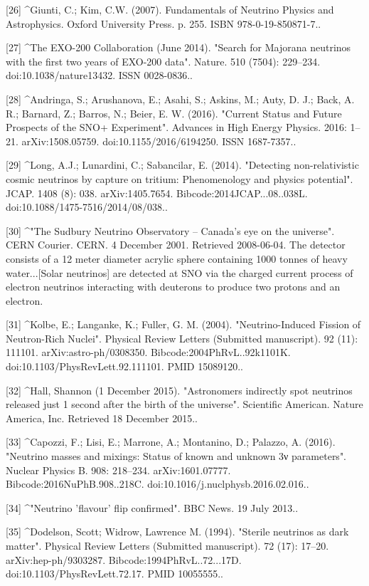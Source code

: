 [26]
^Giunti, C.; Kim, C.W. (2007). Fundamentals of Neutrino Physics and Astrophysics. Oxford University Press. p. 255. ISBN 978-0-19-850871-7..

[27]
^The EXO-200 Collaboration (June 2014). "Search for Majorana neutrinos with the first two years of EXO-200 data". Nature. 510 (7504): 229–234. doi:10.1038/nature13432. ISSN 0028-0836..

[28]
^Andringa, S.; Arushanova, E.; Asahi, S.; Askins, M.; Auty, D. J.; Back, A. R.; Barnard, Z.; Barros, N.; Beier, E. W. (2016). "Current Status and Future Prospects of the SNO+ Experiment". Advances in High Energy Physics. 2016: 1–21. arXiv:1508.05759. doi:10.1155/2016/6194250. ISSN 1687-7357..

[29]
^Long, A.J.; Lunardini, C.; Sabancilar, E. (2014). "Detecting non-relativistic cosmic neutrinos by capture on tritium: Phenomenology and physics potential". JCAP. 1408 (8): 038. arXiv:1405.7654. Bibcode:2014JCAP...08..038L. doi:10.1088/1475-7516/2014/08/038..

[30]
^"The Sudbury Neutrino Observatory – Canada's eye on the universe". CERN Courier. CERN. 4 December 2001. Retrieved 2008-06-04. The detector consists of a 12 meter diameter acrylic sphere containing 1000 tonnes of heavy water...[Solar neutrinos] are detected at SNO via the charged current process of electron neutrinos interacting with deuterons to produce two protons and an electron.

[31]
^Kolbe, E.; Langanke, K.; Fuller, G. M. (2004). "Neutrino-Induced Fission of Neutron-Rich Nuclei". Physical Review Letters (Submitted manuscript). 92 (11): 111101. arXiv:astro-ph/0308350. Bibcode:2004PhRvL..92k1101K. doi:10.1103/PhysRevLett.92.111101. PMID 15089120..

[32]
^Hall, Shannon (1 December 2015). "Astronomers indirectly spot neutrinos released just 1 second after the birth of the universe". Scientific American. Nature America, Inc. Retrieved 18 December 2015..

[33]
^Capozzi, F.; Lisi, E.; Marrone, A.; Montanino, D.; Palazzo, A. (2016). "Neutrino masses and mixings: Status of known and unknown 3ν parameters". Nuclear Physics B. 908: 218–234. arXiv:1601.07777. Bibcode:2016NuPhB.908..218C. doi:10.1016/j.nuclphysb.2016.02.016..

[34]
^"Neutrino 'flavour' flip confirmed". BBC News. 19 July 2013..

[35]
^Dodelson, Scott; Widrow, Lawrence M. (1994). "Sterile neutrinos as dark matter". Physical Review Letters (Submitted manuscript). 72 (17): 17–20. arXiv:hep-ph/9303287. Bibcode:1994PhRvL..72...17D. doi:10.1103/PhysRevLett.72.17. PMID 10055555..


